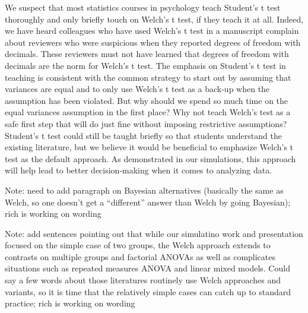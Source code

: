 \documentclass[man,a4paper,noextraspace,apacite]{apa6}
\begin{document}
    We suspect that most statistics courses in psychology teach Student's t 
test thoroughly and only briefly touch on Welch's t test, if they teach it at 
all. Indeed, we have heard colleagues who have used Welch's t test in a 
manuscript complain about reviewers who were suspicious when they reported 
degrees of freedom with decimals. These reviewers must not have learned that 
degrees of freedom with decimals are the norm for Welch's t test. The emphasis 
on Student's t test in teaching is consistent with the common strategy to start 
out by assuming that variances are equal and to only use Welch's t test as a 
back-up when the assumption has been violated. But why should we spend so much 
time on the equal variances assumption in the first place? Why not teach 
Welch's test as a safe first step that will do just fine without imposing 
restrictive assumptions? Student's t test could still be taught briefly so that 
students understand the existing literature, but we believe it would be 
beneficial to emphasize Welch's t test as the default approach. As demonstrated 
in our simulations, this approach will help lead to better decision-making when 
it comes to analyzing data. 

Note: need to add paragraph on Bayesian alternatives (basically the same as 
Welch, so one doesn't get a ``different'' answer than Welch by going Bayesian); 
rich is working on wording

Note: add sentences pointing out that while our simulatino work and 
presentation focused on the simple case of two groups, the Welch approach 
extends to contrasts on multiple groups and factorial ANOVAs as well as 
complicates situations such as repeated measures ANOVA and linear mixed models. 
Could say a few words about those literatures routinely use Welch approaches 
and variants, so it is time that the relatively simple cases can catch up to 
standard practice; rich is working on wording
\end{document}
